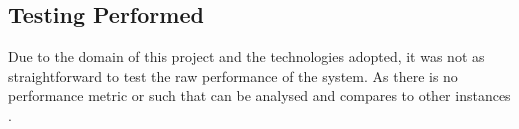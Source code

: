 
\subsection{Testing Performed}
Due to the domain of this project and the technologies adopted, it was not as straightforward to 
test the raw performance of the system. As there is no performance metric or such that can be 
analysed and compares to other instances \cite{Samini2017}. 
